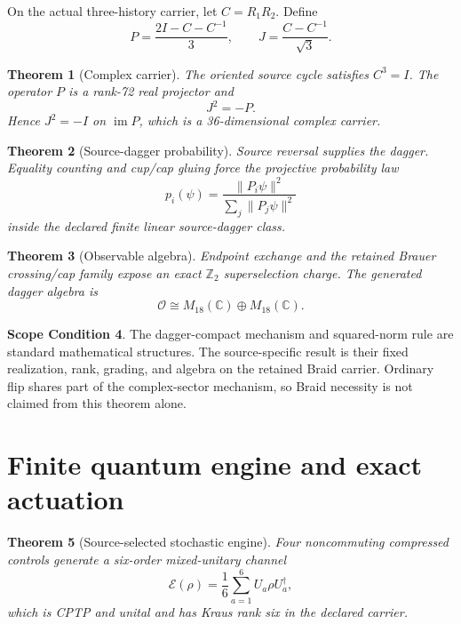\documentclass[11pt]{article}
\newtheorem{theorem}{Theorem}[section]
\theoremstyle{definition}
\newtheorem{scope}[theorem]{Scope Condition}
\theoremstyle{remark}
\newcommand{\cO}{\mathcal O}
\begin{document}
On the actual three-history carrier, let $C=R_1R_2$. Define
\begin{equation}
P=\frac{2I-C-C^{-1}}3,
\qquad
J=\frac{C-C^{-1}}{\sqrt3}.
\label{eq:complexstructure}
\end{equation}

\begin{theorem}[Complex carrier]
The oriented source cycle satisfies $C^3=I$. The operator $P$ is a rank-72 real projector and
\begin{equation}
J^2=-P.
\end{equation}
Hence $J^2=-I$ on $\operatorname{im}P$, which is a 36-dimensional complex carrier.
\end{theorem}

\begin{theorem}[Source-dagger probability]
Source reversal supplies the dagger. Equality counting and cup/cap gluing force the projective probability law
\begin{equation}
p_i(\psi)=\frac{\|P_i\psi\|^2}{\sum_j\|P_j\psi\|^2}
\label{eq:born}
\end{equation}
inside the declared finite linear source-dagger class.
\end{theorem}

\begin{theorem}[Observable algebra]
Endpoint exchange and the retained Brauer crossing/cap family expose an exact $\mathbb Z_2$ superselection charge. The generated dagger algebra is
\begin{equation}
\cO\cong M_{18}(\mathbb C)\oplus M_{18}(\mathbb C).
\label{eq:observablealgebra}
\end{equation}
\end{theorem}

\begin{scope}
The dagger-compact mechanism and squared-norm rule are standard mathematical structures. The source-specific result is their fixed realization, rank, grading, and algebra on the retained Braid carrier. Ordinary flip shares part of the complex-sector mechanism, so Braid necessity is not claimed from this theorem alone.
\end{scope}

\section{Finite quantum engine and exact actuation}

\begin{theorem}[Source-selected stochastic engine]
Four noncommuting compressed controls generate a six-order mixed-unitary channel
\begin{equation}
\mathcal E(\rho)=\frac16\sum_{a=1}^{6}U_a\rho U_a^\dagger,
\end{equation}
which is CPTP and unital and has Kraus rank six in the declared carrier.
\end{theorem}
\end{document}
